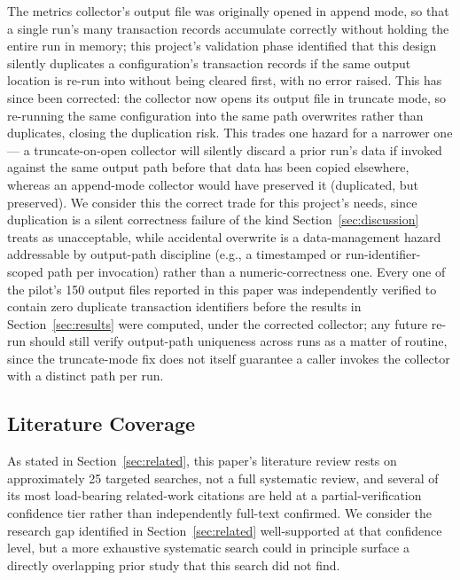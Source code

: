 \documentclass[journal]{IEEEtran}
\begin{document}
The metrics collector's output file was originally opened in append mode, so that a single run's many transaction records accumulate correctly without holding the entire run in memory; this project's validation phase identified that this design silently duplicates a configuration's transaction records if the same output location is re-run into without being cleared first, with no error raised. This has since been corrected: the collector now opens its output file in truncate mode, so re-running the same configuration into the same path overwrites rather than duplicates, closing the duplication risk. This trades one hazard for a narrower one --- a truncate-on-open collector will silently discard a prior run's data if invoked against the same output path before that data has been copied elsewhere, whereas an append-mode collector would have preserved it (duplicated, but preserved). We consider this the correct trade for this project's needs, since duplication is a silent correctness failure of the kind Section~\ref{sec:discussion} treats as unacceptable, while accidental overwrite is a data-management hazard addressable by output-path discipline (e.g., a timestamped or run-identifier-scoped path per invocation) rather than a numeric-correctness one. Every one of the pilot's 150 output files reported in this paper was independently verified to contain zero duplicate transaction identifiers before the results in Section~\ref{sec:results} were computed, under the corrected collector; any future re-run should still verify output-path uniqueness across runs as a matter of routine, since the truncate-mode fix does not itself guarantee a caller invokes the collector with a distinct path per run.

\subsection{Literature Coverage}

As stated in Section~\ref{sec:related}, this paper's literature review rests on approximately 25 targeted searches, not a full systematic review, and several of its most load-bearing related-work citations are held at a partial-verification confidence tier rather than independently full-text confirmed. We consider the research gap identified in Section~\ref{sec:related} well-supported at that confidence level, but a more exhaustive systematic search could in principle surface a directly overlapping prior study that this search did not find.

\end{document}
